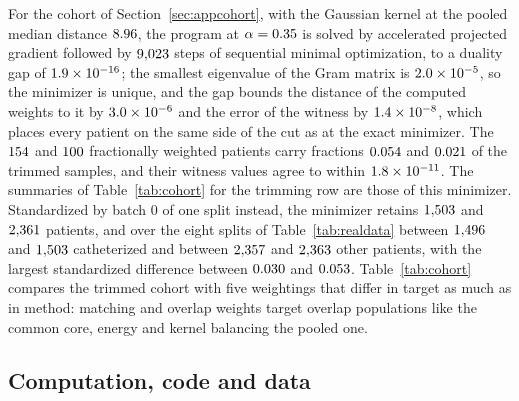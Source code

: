 For the cohort of Section~\ref{sec:appcohort}, with the Gaussian kernel at the pooled median
distance $8.96$, the program at $\alpha=0.35$ is solved by
accelerated projected gradient followed by $9{,}023$ steps of sequential minimal optimization, to a duality
gap of $1.9\times10^{-16}$; the smallest eigenvalue of the Gram matrix is $2.0\times10^{-5}$, so the minimizer is unique, and
the gap bounds the distance of the computed weights to it by $3.0\times10^{-6}$ and the error of the witness by
$1.4\times10^{-8}$, which places every patient on the same side of the cut as at the exact minimizer. The
$154$ and $100$ fractionally weighted patients carry fractions $0.054$ and
$0.021$ of the trimmed samples, and their witness values agree to within $1.8\times10^{-11}$. The summaries of
Table~\ref{tab:cohort} for the trimming row are those of this minimizer. Standardized by batch $0$ of one split
instead, the minimizer retains $1{,}503$ and $2{,}361$ patients, and over the eight splits of
Table~\ref{tab:realdata} between $1{,}496$ and $1{,}503$ catheterized and between $2{,}357$ and
$2{,}363$ other patients, with the largest standardized difference between $0.030$ and
$0.053$. Table~\ref{tab:cohort} compares the trimmed cohort with five weightings that differ in target as much as in method:
matching and overlap weights target overlap populations like the common core, energy and kernel balancing the pooled one.

\begin{table}[!htb]
\centering
\footnotesize
\setlength{\tabcolsep}{1.9pt}

\caption{The RHC arms under six weightings: trimming with the Gaussian kernel at the level of the Laplace lower bound; matching
\citep{ligreene2013matching} and overlap weights \citep{li2018balancing} from a logistic propensity model; energy
\citep{huling2024energy} and kernel balancing \citep{hazlett2020kernel,kallus2020optimal} of each arm to the pooled
sample. Effective fraction: Kish effective sample size over arm size; absolute standardized mean differences (SMD) over
the $\rrRhcNcovFull$ covariates; overlap: overlapping coefficient of the propensity distributions; risk difference:
$30$-day mortality, catheterized minus others, $95\%$ percentile interval from $\lcBoot$ bootstrap resamples within each
arm, weights fixed.}
\label{tab:cohort}
\end{table}

\subsection{Computation, code and data}
\label{sec:computationdetails}

